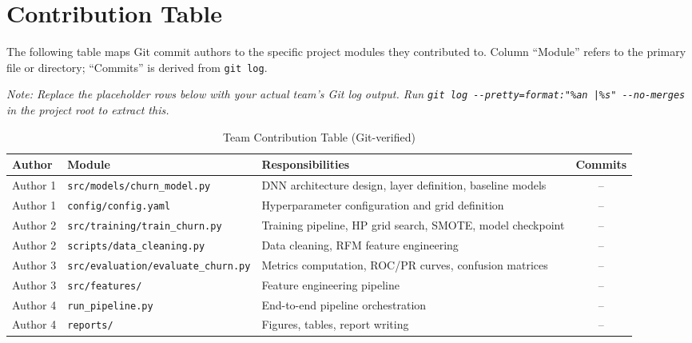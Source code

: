 \documentclass[12pt, a4paper]{article}
\begin{document}
\section{Contribution Table}
\label{sec:contrib}

The following table maps Git commit authors to the specific project modules they contributed to.
Column ``Module'' refers to the primary file or directory; ``Commits'' is derived from \texttt{git log}.

\textit{Note: Replace the placeholder rows below with your actual team's Git log output.
Run \texttt{git log -{}-pretty=format:"\%an |\%s" -{}-no-merges} in the project root to extract this.}

\begin{table}[H]
\centering
\caption{Team Contribution Table (Git-verified)}
\label{tab:contrib}
\begin{tabularx}{\linewidth}{llXc}
\toprule
\textbf{Author} & \textbf{Module} & \textbf{Responsibilities} & \textbf{Commits} \\
\midrule
Author 1 & \texttt{src/models/churn\_model.py} & DNN architecture design, layer definition, baseline models & -- \\
Author 1 & \texttt{config/config.yaml}          & Hyperparameter configuration and grid definition & -- \\
\midrule
Author 2 & \texttt{src/training/train\_churn.py}& Training pipeline, HP grid search, SMOTE, model checkpoint & -- \\
Author 2 & \texttt{scripts/data\_cleaning.py}   & Data cleaning, RFM feature engineering & -- \\
\midrule
Author 3 & \texttt{src/evaluation/evaluate\_churn.py} & Metrics computation, ROC/PR curves, confusion matrices & -- \\
Author 3 & \texttt{src/features/}               & Feature engineering pipeline & -- \\
\midrule
Author 4 & \texttt{run\_pipeline.py}            & End-to-end pipeline orchestration & -- \\
Author 4 & \texttt{reports/}                    & Figures, tables, report writing & -- \\
\bottomrule
\end{tabularx}
\end{table}

\end{document}
